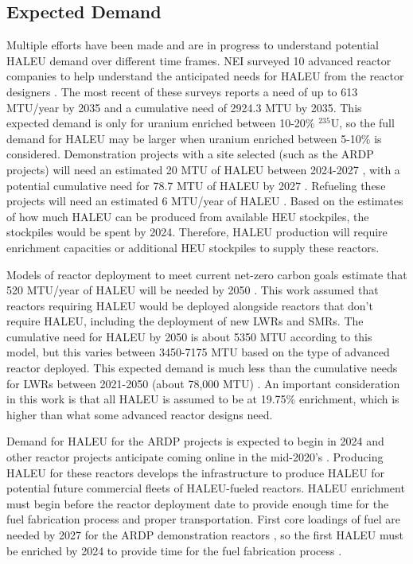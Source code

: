 \subsection{Expected Demand}
Multiple efforts have been made and are in progress to understand
potential \gls{HALEU} demand over different time frames. 
\gls{NEI} surveyed 10 advanced reactor 
companies to help understand the anticipated needs
for \gls{HALEU} from the reactor designers 
\cite{korsnick_need_2018,korsnick_updated_2020,korsnick_updated_2021}. 
The most recent of these surveys \cite{korsnick_updated_2021} reports 
a need of up to 613 MTU/year by 2035 and a cumulative need of 2924.3 MTU 
by 2035. This expected demand is only for uranium enriched between 10-20\%
$^{235}$U, so the full demand for \gls{HALEU} may be larger when uranium 
enriched between 5-10\% is considered. Demonstration projects with a site selected 
(such as the \gls{ARDP} projects) will need an estimated 20 MTU of \gls{HALEU} 
between 2024-2027 
\cite{nuclear_energy_institute_establishing_2022}, with a potential cumulative 
need for 78.7 MTU of \gls{HALEU} by 2027 \cite{korsnick_updated_2021}. 
Refueling these projects will need an estimated 6 MTU/year of 
\gls{HALEU} \cite{nuclear_energy_institute_establishing_2022}. Based 
on the estimates of how much \gls{HALEU} can be produced from available 
\gls{HEU} stockpiles, the stockpiles would be spent by 2024. Therefore, 
\gls{HALEU} production will require enrichment capacities or additional 
\gls{HEU} stockpiles to supply these reactors. 

Models of reactor deployment to meet current net-zero carbon goals 
estimate that 520 MTU/year of \gls{HALEU} will be needed by 2050 
\cite{dixon_estimated_2022}. This work assumed that reactors 
requiring \gls{HALEU} would be deployed alongside reactors that don't 
require \gls{HALEU}, including the deployment of new 
\glspl{LWR} and \glspl{SMR}. 
The cumulative need for \gls{HALEU} by 2050 
is about 5350 MTU according to this model, but this varies between 
3450-7175 MTU based on the type of advanced reactor deployed. 
This expected demand is much less than the 
cumulative needs for \glspl{LWR} between 2021-2050 (about 78,000 MTU) 
\cite{dixon_estimated_2022}. An important 
consideration in this work is that all \gls{HALEU} is assumed to be 
at 19.75\% enrichment, which is higher than what some advanced reactor 
designs need. 

Demand for \gls{HALEU} for the \gls{ARDP} projects is expected to begin in 
2024 and other reactor projects anticipate coming online in the 
mid-2020's \cite{nuclear_energy_institute_establishing_2022}. 
Producing \gls{HALEU} for these reactors develops the infrastructure 
to produce \gls{HALEU} for potential future commercial fleets of 
\gls{HALEU}-fueled reactors. 
\gls{HALEU} enrichment must begin before the reactor deployment 
date to provide enough 
time for the fuel fabrication process and proper transportation. First 
core loadings of fuel are needed by 2027 for the \gls{ARDP} 
demonstration reactors \cite{dixon_estimated_2022}, so the 
first \gls{HALEU} must be enriched by 2024 to provide 
time for the fuel fabrication process 
\cite{nuclear_energy_institute_establishing_2022}. 

